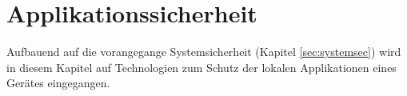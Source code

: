 \section{Applikationssicherheit}
	Aufbauend auf die vorangegange Systemsicherheit (Kapitel \ref{sec:systemsec})
	wird in diesem Kapitel auf Technologien zum Schutz der lokalen Applikationen
	eines Gerätes eingegangen.
